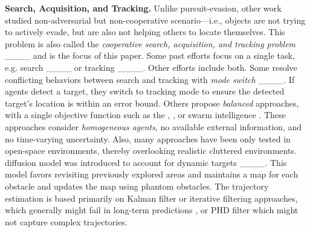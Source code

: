 \textbf{Search, Acquisition, and Tracking.} Unlike  pursuit-evasion, other work studied non-adversarial but non-cooperative scenario---i.e., objects are not trying to actively evade, but are also not helping others to locate themselves. This problem is also called the  \emph{cooperative search, acquisition, and tracking problem} ____ and is the focus of this paper.  
Some past efforts focus on a single task, e.g. search ____ or tracking ____. 
%
Other efforts include both. 
Some resolve conflicting behaviors between search and tracking with \textit{mode switch} ____. If agents detect a target, they switch to tracking mode to ensure the detected target's location is within an error bound. Others propose \textit{balanced} approaches, with a single objective function such as the , ,  or swarm intelligence \revisedtext{____}.  
%
These approaches consider \emph{homogeneous agents}, no available external information, and no time-varying uncertainty. Also, many approaches have been only tested in open-space environments, thereby overlooking realistic cluttered environments.  diffusion model was introduced to account for dynamic targets ____. This model favors revisiting previously explored areas and maintains a map for each obstacle and updates the map using phantom obstacles.  %
The trajectory estimation is based primarily on Kalman filter or iterative filtering approaches, which generally might fail in long-term predictions \revisedtext{____}, or PHD filter which might not capture complex trajectories. 

%

 

%

%


 
%
%
%
%
%




%